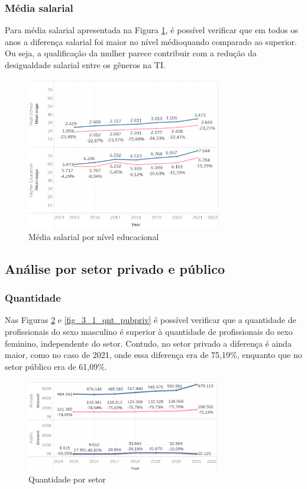 \subsubsection{Média salarial}

Para média salarial apresentada na Figura \ref{fig_2_sal_educ}, é possível verificar que em todos os anos a diferença salarial foi maior no nível médioquando comparado ao superior. Ou seja, a qualificação da mulher parece contribuir com a redução da desigualdade salarial entre os gêneros na TI.

\begin{figure}[htbp]
	\centerline{
		\includegraphics[width=85mm]{assets/2_sal_educ.PNG}
	}
	\caption{Média salarial por nível educacional}
	\label{fig_2_sal_educ}
\end{figure}

\subsection{Análise por setor privado e público}  \label{sub:privpub}

\subsubsection{Quantidade}

Nas Figuras \ref{fig_3_qnt_pubpriv} e \ref{fig_3_1_qnt_pubpriv} é possível verificar que a quantidade de profissionais do sexo masculino é superior à quantidade de profissionais do sexo feminino, independente do setor. Contudo, no setor privado a diferença é ainda maior, como no caso de 2021, onde essa diferença era de 75,19\%, enquanto que no setor público era de 61,09\%.

\begin{figure}[htbp]
	\centerline{
		\includegraphics[width=85mm]{assets/3_qnt_pubpriv.PNG}
	}
	\caption{Quantidade por setor}
	\label{fig_3_qnt_pubpriv}
\end{figure}


